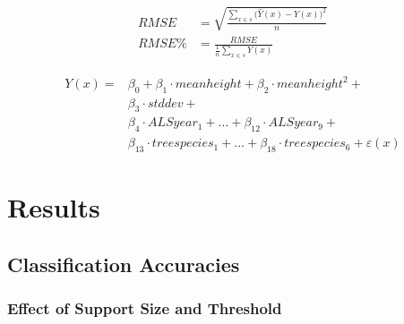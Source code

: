 \begin{subequations}\label{eq:RMSE}
	\begin{align}
	RMSE &= \sqrt{\frac{\sum_{x \in s}\big(\hat{Y}(x)-Y(x)\big)^2}{n}} \label{eq:RMSEa}\\
	RMSE\% &= \frac{RMSE}{\frac{1}{n}\sum_{x \in s}Y(x)}	\label{eq:RMSEb}
	\end{align}
\end{subequations}


\begin{equation} \label{eq:chmtspec_fullmod_term}
\begin{split}
Y(x) = &\beta_{0} + \beta_{1} \cdot meanheight + \beta_{2} \cdot meanheight^{2} + \\ 
&\beta_{3} \cdot stddev + \\
&\beta_{4} \cdot ALSyear_1 + ... + \beta_{12} \cdot ALSyear_9 + \\
&\beta_{13} \cdot treespecies_1 + ... + \beta_{18} \cdot treespecies_6 + \varepsilon(x)
\end{split}
\end{equation}




\section{Results}
\label{sec:Res}

\subsection{Classification Accuracies}
\label{sec:supp_tspec_res}

\subsubsection*{Effect of Support Size and Threshold}

